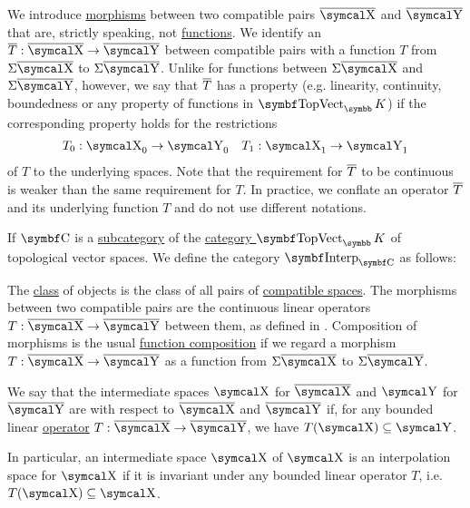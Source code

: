 \begin{definition}
\begin{DefEnum}
     We introduce \hyperref[def:category/morphisms]{morphisms} between two compatible pairs \( \Ol{\CX} \) and \( \Ol{\CY} \) that are, strictly speaking, not \hyperref[def:function]{functions}. We identify an  \( \Ol{T}: \Ol{\CX} \to \Ol{\CY} \) between compatible pairs with a function \( T \) from \( \Sigma \Ol{\CX} \) to \( \Sigma \Ol{\CY} \). Unlike for functions between \( \Sigma \Ol{\CX} \) and \( \Sigma \Ol{\CY} \), however, we say that \( \overline{T} \) has a property (e.g. linearity, continuity, boundedness or any property of functions in \( \Cat{TopVect}_\BK \)) if the corresponding property holds for the restrictions
    \begin{align*}
      T_0: \CX_0 \to \CY_0
      &&
      T_1: \CX_1 \to \CY_1
    \end{align*}
    of \( T \) to the underlying spaces. Note that the requirement for \( \overline{T} \) to be continuous is weaker than the same requirement for \( T \). In practice, we conflate an operator \( \overline{T} \) and its underlying function \( T \) and do not use different notations.

     If \( \Cat{C} \) is a \hyperref[def:subcategory]{subcategory} of the \hyperref[def:category_of_topological_vector_spaces]{category \( \Cat{TopVect}_\BK \)} of topological vector spaces. We define the category \( \Cat{Interp}_{\Cat{C}} \) as follows:
    \begin{RefList}
       The \hyperref[def:set_zfc]{class} of objects is the class of all pairs of \hyperref[def:interpolated_topological_vector_space/compatibility]{compatible spaces}.
       The morphisms between two compatible pairs are the continuous linear operators \( T: \Ol{\CX} \to \Ol{\CY} \) between them, as defined in .
       Composition of morphisms is the usual \hyperref[def:function/composition]{function composition} if we regard a morphism \( T: \Ol{\CX} \to \Ol{\CY} \) as a function from \( \Sigma \Ol{\CX} \) to \( \Sigma \Ol{\CY} \).
    \end{RefList}

     We say that the intermediate spaces \( \CX \) for \( \Ol{\CX} \) and \( \CY \) for \( \Ol{\CY} \) are  with respect to \( \Ol{\CX} \) and \( \Ol{\CY} \) if, for any bounded linear \hyperref[def:interpolated_topological_vector_space/morphisms]{operator} \( T: \Ol{\CX} \to \Ol{\CY} \), we have \( T(\CX) \subseteq \CY \).

    In particular, an intermediate space \( \CX \) of \( \CX \) is an interpolation space for \( \CX \) if it is invariant under any bounded linear operator \( T \), i.e. \( T(\CX) \subseteq \CX \).
  \end{DefEnum}
\end{definition}
